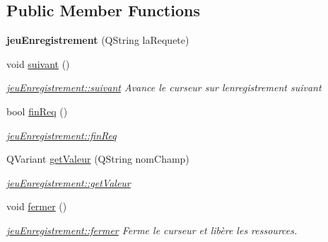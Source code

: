 \subsection*{Public Member Functions}
\begin{DoxyCompactItemize}
\item 
\mbox{\label{classjeu_enregistrement_a941dbc3f9dd9c1c196ead81d045850bf}} 
{\bfseries jeu\+Enregistrement} (Q\+String la\+Requete)
\item 
\mbox{\label{classjeu_enregistrement_aa26dd78c24b4fbaec948380d8907d4d9}} 
void \hyperlink{classjeu_enregistrement_aa26dd78c24b4fbaec948380d8907d4d9}{suivant} ()
\begin{DoxyCompactList}\small\item\em \hyperlink{classjeu_enregistrement_aa26dd78c24b4fbaec948380d8907d4d9}{jeu\+Enregistrement\+::suivant} Avance le curseur sur l\textquotesingle{}enregistrement suivant \end{DoxyCompactList}\item 
bool \hyperlink{classjeu_enregistrement_ad4689ab49e4a51fde86e3b00e15e473e}{fin\+Req} ()
\begin{DoxyCompactList}\small\item\em \hyperlink{classjeu_enregistrement_ad4689ab49e4a51fde86e3b00e15e473e}{jeu\+Enregistrement\+::fin\+Req} \end{DoxyCompactList}\item 
Q\+Variant \hyperlink{classjeu_enregistrement_acd8e0e1bc08d6b1a5c5966d565e134a2}{get\+Valeur} (Q\+String nom\+Champ)
\begin{DoxyCompactList}\small\item\em \hyperlink{classjeu_enregistrement_acd8e0e1bc08d6b1a5c5966d565e134a2}{jeu\+Enregistrement\+::get\+Valeur} \end{DoxyCompactList}\item 
\mbox{\label{classjeu_enregistrement_adee0dc84769c49230dbd6b32ec0bd946}} 
void \hyperlink{classjeu_enregistrement_adee0dc84769c49230dbd6b32ec0bd946}{fermer} ()
\begin{DoxyCompactList}\small\item\em \hyperlink{classjeu_enregistrement_adee0dc84769c49230dbd6b32ec0bd946}{jeu\+Enregistrement\+::fermer} Ferme le curseur et libère les ressources. \end{DoxyCompactList}\end{DoxyCompactItemize}


